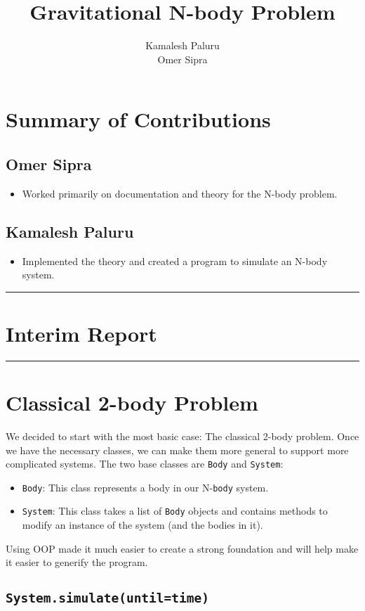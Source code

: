 \documentclass[hidelinks, 11pt]{article}
\title{Gravitational N-body Problem}
\author{Kamalesh Paluru \\ Omer Sipra}
\newcommand{\psection}[1]{{
    \begin{center}
        \noindent \rule{17cm}{0.4pt}
            \section*{\LARGE #1}
        \noindent \rule{17cm}{0.4pt}
    \end{center}
}}
\newcommand{\psubsection}[1]{
    \noindent 
    \section*{#1}
}
\newcommand{\psubsubsection}[1]{
    \noindent
    \subsection*{#1}
}
\begin{document}
\maketitle

\psubsection{Summary of Contributions}
\psubsubsection{Omer Sipra}
\begin{itemize}
    \item Worked primarily on documentation and theory for the N-body problem.
\end{itemize}

\psubsubsection{Kamalesh Paluru}
\begin{itemize}
    \item Implemented the theory and created a program to simulate an N-body system.
\end{itemize}
\newpage

\psection{Interim Report}

\psubsection{Classical 2-body Problem}

We decided to start with the most basic case: The classical 2-body problem. Once we have the necessary classes, we can make them more general to support more complicated systems. The two base classes are \texttt{Body} and \texttt{System}:

    \begin{itemize}
        \item \texttt{Body}: This class represents a body in our N-\texttt{body} system.
        \item \texttt{System}: This class takes a list of \texttt{Body} objects and contains methods to modify an instance of the system (and the bodies in it).
    \end{itemize}

\noindent
Using OOP made it much easier to create a strong foundation and will help make it easier to generify the program.

    \psubsubsection{\texttt{System.simulate(until=time)}}
\end{document}
